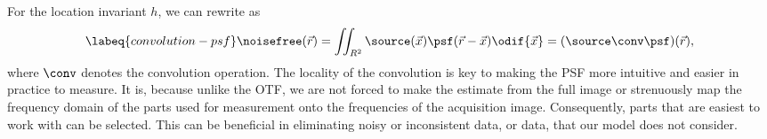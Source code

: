 For the location invariant \(h\), we can rewrite  as
    \begin{equation}
        \labeq{convolution-psf}
        \noisefree(\vec{r}) = \iint_{R^2} \source(\vec{x}) \psf(\vec{r} - \vec{x}) \odif{\vec{x}} = 
            (\source \conv \psf)(\vec{r}),
    \end{equation}
    where \(\conv\) denotes the convolution operation.
The locality of the convolution is key to making the 
    \ac{PSF} more intuitive and easier in practice to measure.
It is, because unlike the \ac{OTF}, we are not forced to make the estimate from the full image or strenuously map the
    frequency domain of the parts used for measurement onto the frequencies of the acquisition image.
Consequently, parts that are easiest to work with can be selected.
This can be beneficial in eliminating noisy or inconsistent data, or data, that our model does not consider.


